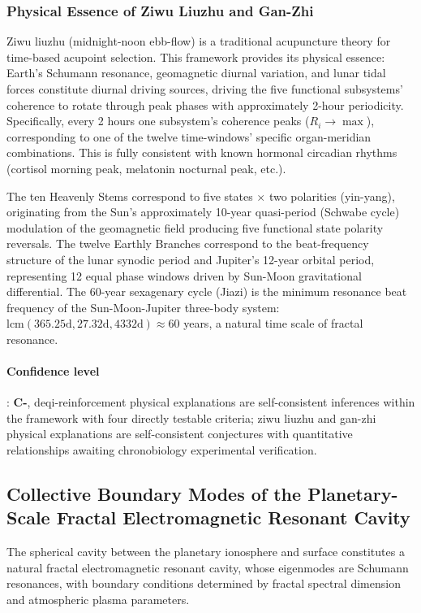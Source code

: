 \documentclass[12pt,a4paper,twocolumn]{article}
\begin{document}
\subsubsection{Physical Essence of Ziwu Liuzhu and Gan-Zhi}
\label{subsec:ziwu_liuzhu}
Ziwu liuzhu (midnight-noon ebb-flow) is a traditional acupuncture theory for time-based acupoint selection. This framework provides its physical essence: Earth's Schumann resonance, geomagnetic diurnal variation, and lunar tidal forces constitute diurnal driving sources, driving the five functional subsystems' coherence to rotate through peak phases with approximately 2-hour periodicity. Specifically, every 2 hours one subsystem's coherence peaks ($R_i\to\max$), corresponding to one of the twelve time-windows' specific organ-meridian combinations. This is fully consistent with known hormonal circadian rhythms (cortisol morning peak, melatonin nocturnal peak, etc.).

The ten Heavenly Stems correspond to five states $\times$ two polarities (yin-yang), originating from the Sun's approximately 10-year quasi-period (Schwabe cycle) modulation of the geomagnetic field producing five functional state polarity reversals. The twelve Earthly Branches correspond to the beat-frequency structure of the lunar synodic period and Jupiter's 12-year orbital period, representing 12 equal phase windows driven by Sun-Moon gravitational differential. The 60-year sexagenary cycle (Jiazi) is the minimum resonance beat frequency of the Sun-Moon-Jupiter three-body system: $\text{lcm}(365.25\text{d}, 27.32\text{d}, 4332\text{d})\approx60$ years, a natural time scale of fractal resonance.

\paragraph{Confidence level}: \textbf{C-}, deqi-reinforcement physical explanations are self-consistent inferences within the framework with four directly testable criteria; ziwu liuzhu and gan-zhi physical explanations are self-consistent conjectures with quantitative relationships awaiting chronobiology experimental verification.



\subsection{Collective Boundary Modes of the Planetary-Scale Fractal Electromagnetic Resonant Cavity}
\label{subsec:planetary_cavity}
The spherical cavity between the planetary ionosphere and surface constitutes a natural fractal electromagnetic resonant cavity, whose eigenmodes are Schumann resonances, with boundary conditions determined by fractal spectral dimension and atmospheric plasma parameters.
\end{document}
